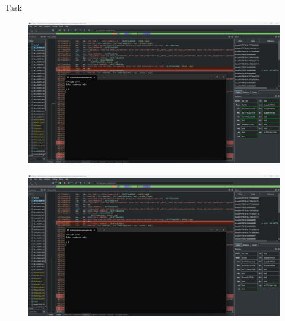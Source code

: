 \documentclass[a4paper,12pt]{article}
\newcommand{\RomanNumeralCaps}[1]{\MakeUppercase{\romannumeral #1}}
\begin{document}
\newpage
    \begin{center}
        \Large{Task \RomanNumeralCaps{1}}
    \end{center}
    \begin{figure}[h!]
        \begin{minipage}[h]{1\linewidth}
            \centering
            \includegraphics[width=1\linewidth]{Prt sc/1_1.png}  
        \end{minipage}
    \end{figure}
    \begin{figure}[h!]
        \begin{minipage}[h]{1\linewidth}
            \centering
            \includegraphics[width=1\linewidth]{Prt sc/1_2.png}  
        \end{minipage}
    \end{figure}
\end{document}

